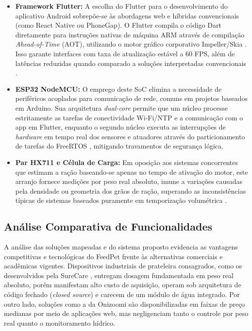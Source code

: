\documentclass[12pt]{article}\usepackage{sbc-template}\usepackage{graphicx,url}\usepackage[utf8]{inputenc}
\begin{document}
\begin{itemize}
    \item \textbf{Framework Flutter:} A escolha do Flutter para o desenvolvimento do aplicativo Android sobrepõe-se às abordagens web e híbridas convencionais (como React Native ou PhoneGap). O Flutter compila o código Dart diretamente para instruções nativas de máquina ARM através de compilação \textit{Ahead-of-Time} (AOT), utilizando o motor gráfico corporativo Impeller/Skia \cite{google:flutter_arch}. Isso garante interfaces com taxa de atualização estável a 60 FPS, além de latências reduzidas quando comparado a soluções interpretadas convencionais \cite{sardinha:23}.
    \item \textbf{ESP32 NodeMCU:} O emprego deste SoC elimina a necessidade de periféricos acoplados para comunicação de rede, comuns em projetos baseados em Arduino. Sua arquitetura \textit{dual-core} permite que um núcleo processe estritamente as tarefas de conectividade Wi-Fi/NTP e a comunicação com o app em Flutter, enquanto o segundo núcleo executa as interrupções de \textit{hardware} em tempo real dos sensores e atuadores através do particionamento de tarefas do FreeRTOS \cite{gay:18}, mitigando travamentos de segurança lógica.
    \item \textbf{Par HX711 e Célula de Carga:} Em oposição aos sistemas concorrentes que estimam a ração baseando-se apenas no tempo de ativação do motor, este arranjo fornece medições por peso real absoluto, imune a variações causadas pela densidade ou geometria dos grãos de ração, superando as inconsistências típicas de sistemas baseados puramente em temporização volumétrica \cite{zhang:21}.
\end{itemize}

\subsection{Análise Comparativa de Funcionalidades}
A análise das soluções mapeadas e do sistema proposto evidencia as vantagens competitivas e tecnológicas do FeedPet frente às alternativas comerciais e acadêmicas vigentes. Dispositivos industriais de prateleira consagrados, como os desenvolvidos pela SureCare \cite{surecare:26}, entregam dosagem fundamentada em peso real absoluto, porém manifestam alto custo de aquisição, operam sob arquitetura de código fechado (\textit{closed source}) e carecem de um módulo de água integrado. Por outro lado, soluções como a da Onizoomi \cite{onizoomi:26} são disponibilizadas em faixas de preço medianas por meio de aplicações web, mas negligenciam tanto o controle por peso real quanto o monitoramento hídrico.
\end{document}
